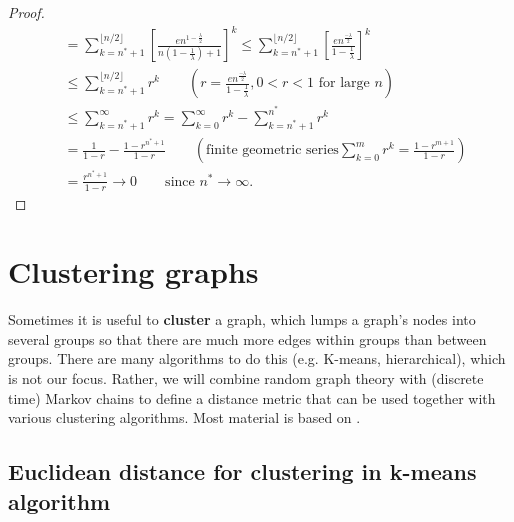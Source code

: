 \documentclass[./some_latex_template.tex]{subfiles}
\begin{document}
\begin{proof}
\begin{align*}
	&= \sum_{k=n^* + 1}^{\lfloor n/2 \rfloor} \left[\frac{en^{1 - \frac{\lambda}{2}}}{n(1 - \frac{1}{\lambda}) + 1}\right]^k \le \sum_{k=n^* + 1}^{\lfloor n/2 \rfloor} \left[\frac{en^{\frac{-\lambda}{2}}}{1 - \frac{1}{\lambda}}\right]^k\\
	&\le \sum_{k=n^* + 1}^{\lfloor n/2 \rfloor}  r^k \qquad (r = \frac{en^{\frac{-\lambda}{2}}}{1 - \frac{1}{\lambda}}, 0 < r < 1 \text{ for large }n)\\
	&\le \sum_{k=n^* + 1}^{\infty}r^k  = \sum_{k=0}^{\infty}r^k - \sum_{k=n^* + 1}^{n^*}r^k\\
	&= \frac{1}{1-r} - \frac{1-r^{n^*+1}}{1-r} \qquad (\text{finite geometric series} \sum_{k=0}^{m}r^k = \frac{1-r^{m+1}}{1-r})\\
	&= \frac{r^{n^* + 1}}{1-r} \longrightarrow 0 \qquad \text{since } n^* \rightarrow \infty.
\end{align*}
\end{proof}

\section{Clustering graphs}

Sometimes it is useful to \textbf{cluster} a graph, which lumps a graph's nodes into several groups so that there are much more edges within groups than between groups. There are many algorithms to do this (e.g. K-means, hierarchical), which is not our focus. Rather, we will combine random graph theory with (discrete time) Markov chains to define a distance metric that can be used together with various clustering algorithms. Most material is based on \cite{yen2005clustering}. 

%

\subsection{Euclidean distance for clustering in k-means algorithm}
\end{document}
